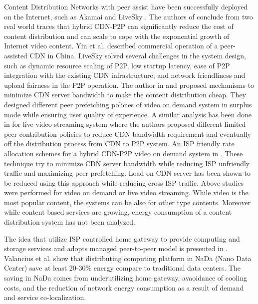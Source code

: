 \documentclass[JIP]{ipsj}
\begin{document}
Content Distribution Networks with peer assist have been successfully deployed on the Internet, such as Akamai \cite{Huang:2008:UHC:1496046.1496064} and LiveSky \cite{Yin:2010:LEC:1823746.1823750}.  
The authors of \cite{Huang:2008:UHC:1496046.1496064} conclude from two real world traces that hybrid CDN-P2P can significantly reduce the cost of content distribution and can scale to cope with the exponential growth of Internet video content.  
Yin et al. \cite{Yin:2010:LEC:1823746.1823750} described commercial operation of a peer-assisted CDN in China.  
LiveSky solved several challenges in the system design, such as dynamic resource scaling of P2P, low startup latency, ease of P2P integration with the existing CDN infrastructure, and network friendliness and upload fairness in the P2P operation.  
The author in \cite{Huang:2007:IVP:1282427.1282396} and \cite{huang2007peer} proposed mechanisms to minimize CDN server bandwidth to make the content distribution cheap.
They designed different peer prefetching policies of video on demand system in surplus mode while ensuring user quality of experience.
A similar analysis has been done in \cite{xu2006analysis} for live video streaming system where the authors proposed different limited peer contribution policies to reduce CDN bandwidth requirement and eventually off the distribution process from CDN to P2P system. 
An ISP friendly rate allocation schemes for a hybrid CDN-P2P video on demand system in \cite{Wang:2008:IRA:1459359.1459397}. 
These technique try to minimize CDN server bandwidth while reducing ISP unfriendly traffic and maximizing peer prefetching.
Load on CDN server has been shown to be reduced using this approach while reducing cross ISP traffic.
Above studies were performed for video on demand or live video streaming.
While video is the most popular content, the systems can be also for other type contents.
Moreover while content based services are growing, energy consumption of a content distribution system has not been analyzed.

The idea that utilize ISP controlled home gateway to provide computing and storage services and adopts managed peer-to-peer model is presented in \cite{valancius2009greening}. 
Valancius et al. \cite{valancius2009greening} show that distributing computing platform in NaDa (Nano Data Center) save at least 20-30\% energy compare to traditional data centers.
The saving in NaDa comes from underutilizing home gateway, avaoidance of cooling costs, and the reduction of network energy consumption as a result of demand and service co-localization.
\end{document}

